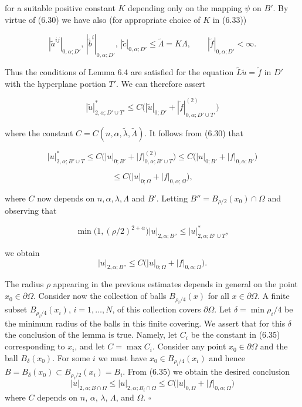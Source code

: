 \noindent for a suitable positive constant $K$ depending only on the mapping $\psi$ on $B'$. By virtue of (6.30) we have also (for appropriate choice of $K$ in (6.33))

\begin{equation}
\tag{6.34}
|\tilde a^{ij}|_{0,\alpha;D'},\,|\tilde b^i|_{0,\alpha;D'},\,|\tilde c|_{0,\alpha;D'}\le \tilde\Lambda=K\Lambda,\qquad |\tilde f|_{0,\alpha;D'}<\infty.
\end{equation}

\noindent Thus the conditions of Lemma 6.4 are satisfied for the equation $\tilde L\tilde u=\tilde f$ in $D'$ with the hyperplane portion $T'$. We can therefore assert

\begin{equation*}
|\tilde u|_{2,\alpha;D'\cup T'}^* \le C\bigl(|\tilde u|_{0;D'}+|\tilde f|^{(2)}_{0,\alpha;D'\cup T'}\bigr)
\end{equation*}

\noindent where the constant $C=C(n,\alpha,\tilde\lambda,\tilde\Lambda)$. It follows from (6.30) that

\begin{equation*}
|u|_{2,\alpha;B'\cup T}^* \le C\bigl(|u|_{0;B'}+|f|^{(2)}_{0,\alpha;B'\cup T}\bigr)\le C\bigl(|u|_{0;B'}+|f|_{0,\alpha;B'}\bigr)
\end{equation*}

\begin{equation*}
\le C\bigl(|u|_{0;\Omega}+|f|_{0,\alpha;\Omega}\bigr),
\end{equation*}

\noindent where $C$ now depends on $n,\alpha,\lambda,\Lambda$ and $B'$. Letting $B''=B_{\rho/2}(x_0)\cap \Omega$ and observing that

\begin{equation*}
\min\bigl(1,(\rho/2)^{2+\alpha}\bigr)|u|_{2,\alpha;B''}\le |u|_{2,\alpha;B'\cup T}^*,
\end{equation*}

we obtain
\[
\tag{6.35}
\lvert u\rvert_{2,\alpha;B''}\le C\bigl(\lvert u\rvert_{0;\Omega}+\lvert f\rvert_{0,\alpha;\Omega}\bigr).
\]

The radius \(\rho\) appearing in the previous estimates depends in general on the point \(x_0\in \partial\Omega\). Consider now the collection of balls \(B_{\rho_i/4}(x)\) for all \(x\in \partial\Omega\). A finite subset \(B_{\rho_i/4}(x_i)\), \(i=1,\dots,N\), of this collection covers \(\partial\Omega\). Let \(\delta=\min \rho_i/4\) be the minimum radius of the balls in this finite covering. We assert that for this \(\delta\) the conclusion of the lemma is true. Namely, let \(C_i\) be the constant in (6.35) corresponding to \(x_i\), and let \(C=\max C_i\). Consider any point \(x_0\in \partial\Omega\) and the ball \(B_\delta(x_0)\). For some \(i\) we must have \(x_0\in B_{\rho_i/4}(x_i)\) and hence \(B=B_\delta(x_0)\subset B_{\rho_i/2}(x_i)=B_i\). From (6.35) we obtain the desired conclusion
\[
\lvert u\rvert_{2,\alpha;B\cap\Omega}\le \lvert u\rvert_{2,\alpha;B_i\cap\Omega}\le C\bigl(\lvert u\rvert_{0,\Omega}+\lvert f\rvert_{0,\alpha;\Omega}\bigr)
\]
where \(C\) depends on \(n\), \(\alpha\), \(\lambda\), \(\Lambda\), and \(\Omega\). \(\square\)

